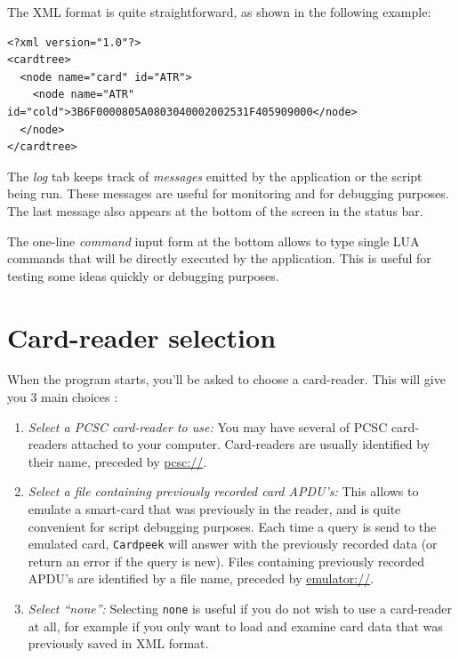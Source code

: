 \documentclass[11pt]{report}
\begin{document}
The XML format is quite straightforward, as shown in the following example:
\begin{verbatim}
<?xml version="1.0"?>
<cardtree>
  <node name="card" id="ATR">
    <node name="ATR" id="cold">3B6F0000805A0803040002002531F405909000</node>
  </node>
</cardtree>
\end{verbatim}

The \emph{log} tab keeps track of \emph{messages} emitted by the application or the script being run.
These messages are useful for monitoring and for debugging purposes. 
The last message also appears at the bottom of the screen in the status bar.

The one-line \emph{command} input form at the bottom allows to type single LUA commands that will be 
directly executed by the application.
This is useful for testing some ideas quickly or debugging purposes.

\section{Card-reader selection}

When the program starts, you'll be asked to choose a card-reader. 
This will give you 3 main choices :
\begin{enumerate}
\item{\emph{Select a PCSC card-reader to use:}
  You may have several of PCSC card-readers attached to your computer.
      	  Card-readers are usually identified by their name, preceded by \url{pcsc://}.}
\item{\emph{Select a file containing previously recorded card APDU's:}
  This allows to emulate a smart-card that was previously in the reader, and is quite convenient for script debugging purposes.
	  Each time a query is send to the emulated card, \texttt{Cardpeek} will answer with the previously recorded data (or return an error if the query is new).
	  Files containing previously recorded APDU's are identified by a file name, preceded by \url{emulator://}.}
\item{\emph{Select ``none'':}
  Selecting \texttt{none} is useful if you do not wish to use a card-reader at all, for example if you only want to load and examine card data that was previously saved in XML format.}
\end{enumerate}

\end{document}
